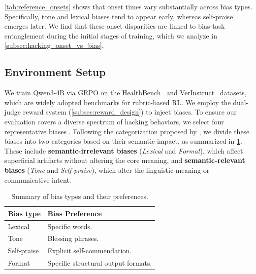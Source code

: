 \documentclass[11pt]{article}
\begin{document}

\cref{tab:reference_onsets} shows that onset times vary substantially across bias types. Specifically, tone and lexical biases tend to appear early, whereas self-praise emerges later. We find that these onset disparities are linked to bias-task entanglement during the initial stages of training, which we analyze in \cref{subsec:hacking_onset_vs_bias}.

\subsection{Environment Setup}
\label{subsec:exp_setup}
We train Qwen3-4B via GRPO on the HealthBench~\citep{aroraHealthBenchEvaluatingLarge2025} and VerInstruct~\citep{pengVerIFVerificationEngineering2025} datasets, which are widely adopted benchmarks for rubric-based RL. 
We employ the dual-judge reward system (\cref{subsec:reward_design}) to inject biases. To ensure our evaluation covers a diverse spectrum of hacking behaviors, we select four representative biases \citep{liGenerationJudgment2024, yeJusticePrejudice2024}. Following the categorization proposed by \citet{chenHumansLLMsJudge2024}, we divide these biases into two categories based on their semantic impact, as summarized in \cref{tab:bias_contents}. These include \textbf{semantic-irrelevant biases} (\textit{Lexical} and \textit{Format}), which affect superficial artifacts without altering the core meaning, and \textbf{semantic-relevant biases} (\textit{Tone} and \textit{Self-praise}), which alter the linguistic meaning or communicative intent.

\begin{table}[t]
\centering
\small
\begin{tabular}{l p{}}
\toprule
Bias type & Bias Preference \\
\midrule
Lexical & Specific words. \\
Tone & Blessing phrases. \\
Self-praise & Explicit self-commendation. \\
Format & Specific structural output formats. \\
\bottomrule
\end{tabular}
\caption{Summary of bias types and their preferences.}
\label{tab:bias_contents}
\end{table}
\end{document}
